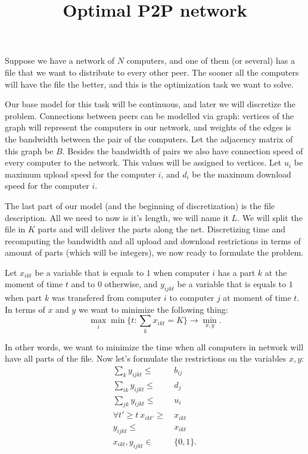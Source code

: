 \documentclass[10pt,a4paper]{article}
\title{Optimal P2P network}
\begin{document}
\maketitle
Suppose we have a network of $N$ computers, and one of them (or several) has a file that we want to distribute to every other peer. The sooner all the computers will have the file the better, and this is the optimization task we want to solve. 

Our base model for this task will be continuous, and later we will discretize the problem. Connections between peers can be modelled via graph: vertices of the graph will represent the computers in our network, and weights of the edges is the bandwidth between the pair of the computers. Let the adjacency matrix of this graph be $B$. Besides the bandwidth of pairs we also have connection speed of every computer to the network. This values will be assigned to vertices. Let $u_i$ be maximum upload speed for the computer $i$, and $d_i$ be the maximum download speed for the computer $i$. 

The last part of our model (and the beginning of discretization) is the file description. All we need to now is it's length, we will name it $L$. We will split the file in $K$ parts and will deliver the parts along the net. Discretizing time and recomputing the bandwidth and all upload and download restrictions in terms of amount of parts (which will be integers), we now ready to formulate the problem.

Let $x_{ikt}$ be a variable that is equals to $1$ when computer $i$ has a part $k$ at the moment of time $t$ and to $0$ otherwise, and $y_{ijkt}$ be a variable that is equals to $1$ when part $k$ was transfered from computer $i$ to computer $j$ at moment of time $t$. In terms of $x$ and $y$ we want to minimize the following thing:
\begin{equation}
	\max_{i} \min \{t: \sum_k x_{ikt} = K \} \to \min_{x, y}.
\end{equation} 

In other words, we want to minimize the time when all computers in network will have all parts of the file. Now let's formulate the restrictions on the variables $x, y$:
\begin{align}
	\label{bandwidth}	\sum_k y_{ijkt} \leqslant & \ b_{ij} \\ 
	\label{download}	\sum_{ik} y_{ijkt} \leqslant & \ d_j \\ 
	\label{upload}	\sum_{jk} y_{ijkt} \leqslant & \ u_i \\ 
	\label{nonerasability}	\forall t' \geqslant t \  x_{ikt'} \geqslant & \ x_{ikt} \\ 
	\label{availability}	y_{ijkt} \leqslant & \ x_{ikt} \\
	\label{binary} x_{ikt}, y_{ijkt} \in & \ \{0, 1 \}.
\end{align}
\end{document}
